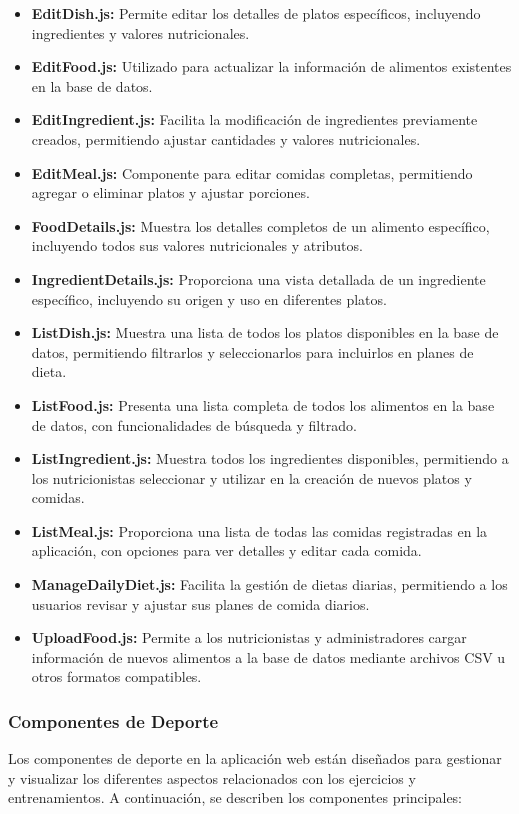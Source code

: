 \begin{itemize}
\item \textbf{EditDish.js:} Permite editar los detalles de platos específicos, incluyendo ingredientes y valores nutricionales.
\item \textbf{EditFood.js:} Utilizado para actualizar la información de alimentos existentes en la base de datos.
\item \textbf{EditIngredient.js:} Facilita la modificación de ingredientes previamente creados, permitiendo ajustar cantidades y valores nutricionales.
\item \textbf{EditMeal.js:} Componente para editar comidas completas, permitiendo agregar o eliminar platos y ajustar porciones.
\item \textbf{FoodDetails.js:} Muestra los detalles completos de un alimento específico, incluyendo todos sus valores nutricionales y atributos.
\item \textbf{IngredientDetails.js:} Proporciona una vista detallada de un ingrediente específico, incluyendo su origen y uso en diferentes platos.
\item \textbf{ListDish.js:} Muestra una lista de todos los platos disponibles en la base de datos, permitiendo filtrarlos y seleccionarlos para incluirlos en planes de dieta.
\item \textbf{ListFood.js:} Presenta una lista completa de todos los alimentos en la base de datos, con funcionalidades de búsqueda y filtrado.
\item \textbf{ListIngredient.js:} Muestra todos los ingredientes disponibles, permitiendo a los nutricionistas seleccionar y utilizar en la creación de nuevos platos y comidas.
\item \textbf{ListMeal.js:} Proporciona una lista de todas las comidas registradas en la aplicación, con opciones para ver detalles y editar cada comida.
\item \textbf{ManageDailyDiet.js:} Facilita la gestión de dietas diarias, permitiendo a los usuarios revisar y ajustar sus planes de comida diarios.
\item \textbf{UploadFood.js:} Permite a los nutricionistas y administradores cargar información de nuevos alimentos a la base de datos mediante archivos CSV u otros formatos compatibles.
\end{itemize}

\subsubsection{Componentes de Deporte}
Los componentes de deporte en la aplicación web están diseñados para gestionar y visualizar los diferentes aspectos relacionados con los ejercicios y entrenamientos. A continuación, se describen los componentes principales:

